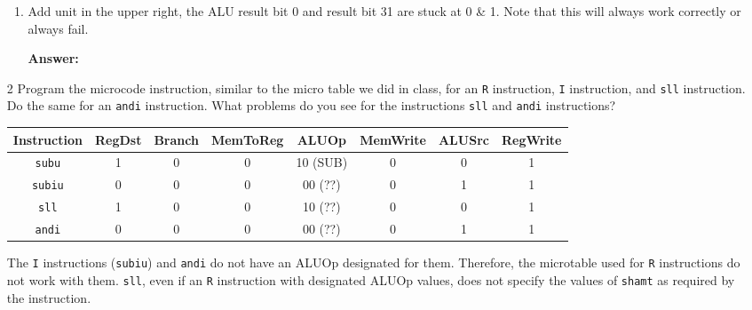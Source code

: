 \documentclass[12pt]{article}
\begin{document}
\begin{enumerate}
\begin{enumerate}[label=4.6.\arabic*]
    \item Add unit in the upper right, the ALU result bit 0 and result bit 31 are stuck at 0 \& 1.  Note that this will always work correctly or always fail.

    \textbf{Answer:} 

  \end{enumerate}

  \item[2] Program the microcode instruction, similar to the micro table we did in class, for an \texttt{R} instruction, \texttt{I} instruction, and \texttt{sll} instruction.  Do the same for an \texttt{andi} instruction.  What problems do you see for the instructions \texttt{sll} and \texttt{andi} instructions?

    \begin{center}
      \begin{tabular}{|c|c|c|c|c|c|c|c|}
      \hline
      Instruction & RegDst & Branch & MemToReg & ALUOp & MemWrite & ALUSrc & RegWrite \\
      \hline
      \texttt{subu} & 1 & 0 & 0 & 10 (SUB) & 0 & 0 & 1 \\
      \hline
      \texttt{subiu} & 0 & 0 & 0 & 00 (??) & 0 & 1 & 1 \\
      \hline
      \texttt{sll} & 1 & 0 & 0 & 10 (??) & 0 & 0 & 1 \\
      \hline
      \texttt{andi} & 0 & 0 & 0 & 00 (??) & 0 & 1 & 1 \\
      \hline
      \end{tabular}
    \end{center}

    The \texttt{I} instructions (\texttt{subiu}) and \texttt{andi} do not have an ALUOp designated for them. Therefore, the microtable used for \texttt{R} instructions do not work with them. \texttt{sll}, even if an \texttt{R} instruction with designated ALUOp values, does not specify the values of \texttt{shamt} as required by the instruction.

  \end{enumerate}
\end{document}
